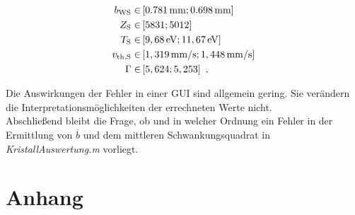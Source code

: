 \documentclass[numbers=noenddot,a4paper,notitlepage,twoside,BCOR15mm]{scrartcl}
\newcommand{\ix}[1]{_\text{#1}}
\newcommand{\tilt}[1]{\textit{#1}}
\begin{document}
			\begin{align}
				b\ix{WS}\in&\left[\unit[0.781]{mm}; \unit[0.698]{mm}\right] \nonumber \\
				Z\ix{S}\in&\left[5831; 5012\right] \nonumber \\
				T\ix{S}\in&\left[\unit[9,68]{eV}; \unit[11,67]{eV}\right] \nonumber \\
				v\ix{th,S}\in&\left[\unit[1,319]{mm/s}; \unit[1,448]{mm/s}\right] \nonumber \\
				\Gamma\in&\left[5,624; 5,253\right] \nonumber \,\,.
			\end{align}

		Die Auswirkungen der Fehler in einer GUI sind allgemein gering. Sie verändern die Interpretationsmöglichkeiten der errechneten Werte nicht.\\
		Abschließend bleibt die Frage, ob und in welcher Ordnung ein Fehler in der Ermittlung von $\overline{b}$ und dem mittleren Schwankungsquadrat in \tilt{KristallAuswertung.m} vorliegt.

	\newpage
	\section{Anhang}

		
		
\end{document}
